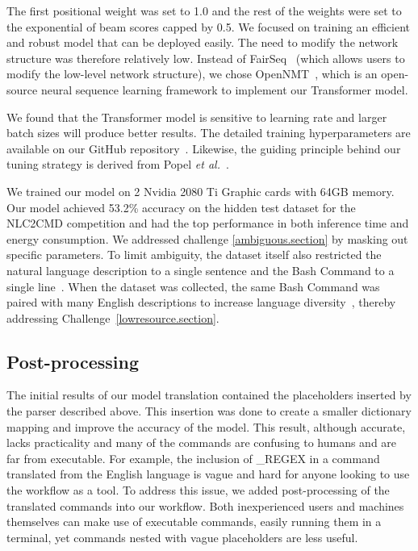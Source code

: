 \documentclass{river-journal}
\begin{document}
The first positional weight was set to 1.0 and the rest of the weights were set to the exponential of beam scores capped by 0.5. We focused on training an efficient and robust model that can be deployed easily. The need to modify the network structure was therefore relatively low. Instead of FairSeq~\cite{Ott2019fairseqAF} (which allows users to modify the low-level network structure), we chose OpenNMT~\cite{Klein2017OpenNMTOT}, which is an open-source neural sequence learning framework to implement our Transformer model. 

We found that the Transformer model is sensitive to learning rate and larger batch sizes will produce better results. The detailed training hyperparameters are available on our GitHub repository~\cite{MagnumNLC2CMD2020}. Likewise, the guiding principle behind our tuning strategy is derived from Popel \textit{et al.}~\cite{Popel2018TrainingTF}. 

We trained our model on 2 Nvidia 2080 Ti Graphic cards with 64GB memory. Our model achieved 53.2\% accuracy on the hidden test dataset for the NLC2CMD competition and had the top performance in both inference time and energy consumption. We addressed challenge \ref{ambiguous.section} by masking out specific parameters. To limit ambiguity, the dataset itself also restricted the natural language description to a single sentence and the Bash Command to a single line~\cite{Lin2018NL2BashAC}. When the dataset was collected, the same Bash Command was paired with many English descriptions to increase language diversity~\cite{Lin2018NL2BashAC}, thereby addressing Challenge~\ref{lowresource.section}. 

\subsection{Post-processing}

The initial results of our model translation contained the placeholders inserted by the parser described above. This insertion was done to create a smaller dictionary mapping and improve the accuracy of the model. This result, although accurate, lacks practicality and many of the commands are confusing to humans and are far from executable. For example, the inclusion of {\_REGEX} in a command translated from the English language is vague and hard for anyone looking to use the workflow as a tool. To address this issue, we added post-processing of the translated commands into our workflow. Both inexperienced users and machines themselves can make use of executable commands, easily running them in a terminal, yet commands nested with vague placeholders are less useful. 
\end{document}
